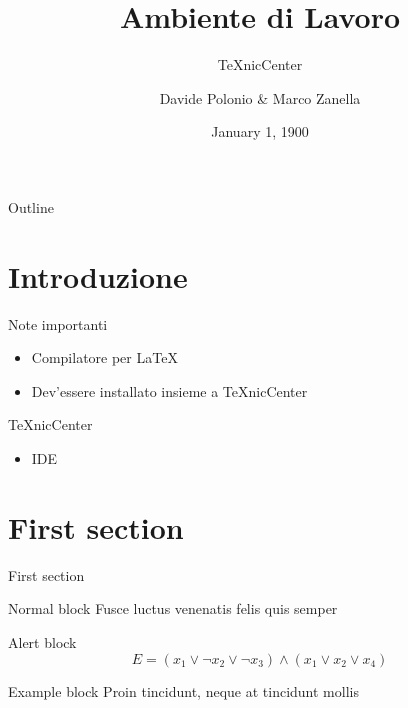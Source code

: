 \documentclass{beamer}
\title{Ambiente di Lavoro}
\subtitle{TeXnicCenter}
\author{Davide Polonio \& Marco Zanella}
\date{January 1, 1900}
\begin{document}
	\maketitle

	\begin{frame}{Outline}
		\tableofcontents
	\end{frame}


	\section{Introduzione}
	\begin{frame}{Note importanti}
	
        \begin{itemize}
         \item Compilatore per \LaTeX
         \item Dev'essere installato insieme a TeXnicCenter
        \end{itemize}

	\end{frame}
	
	\begin{frame}{TeXnicCenter}
	 
	 \begin{itemize}
	  \item IDE
	 \end{itemize}

	\end{frame}



	\section{First section}

	\begin{frame}{First section}
		\begin{block}{Normal block}
			Fusce luctus venenatis felis quis semper
		\end{block}

		\begin{alertblock}{Alert block}
			$$ E = (x_1 \vee \neg x_2 \vee \neg x_3) \wedge (x_1 \vee x_2 \vee x_4) $$
		\end{alertblock}

		\begin{exampleblock}{Example block}
			Proin tincidunt, neque at tincidunt mollis
		\end{exampleblock}
	\end{frame}
\end{document}
